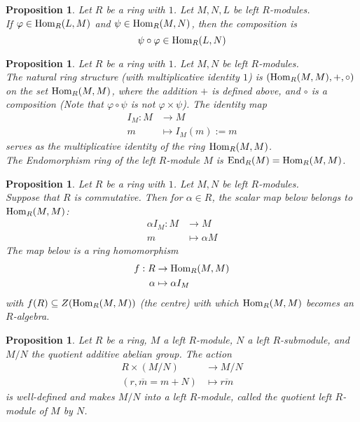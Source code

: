 \documentclass[a4paper,8pt]{article}
\newcommand{\hlt}[1]{\textit{{\color{blue}#1}}}
\newcommand{\homs}[1]{\textnormal{Hom}#1}
\theoremstyle{theorem}
\newtheorem{proposition}[theorem]{Proposition}
\begin{document}
\begin{proposition}
Let $R$ be a ring with $1$. Let $M, N, L$ be left $R$-modules.\\
If $\varphi \in \homs_R(L,M)$ and $\psi \in \homs_R(M,N)$, then the composition is
\begin{equation}
\psi \circ \varphi \in \homs_R(L,N) \nonumber
\end{equation}
\end{proposition}

\begin{proposition}
Let $R$ be a ring with $1$. Let $M, N$ be left $R$-modules.\\
The natural ring structure (with multiplicative identity $1$) is $(\homs_R(M,M), +, \circ)$ on the set $\homs_R(M,M)$, where the addition $+$ is defined above, and $\circ$ is a composition (Note that $\varphi \circ \psi$ is not $\varphi \times \psi$). The identity map
\begin{align}
I_M: M &\rightarrow M \nonumber \\
m &\mapsto I_M(m) := m \nonumber
\end{align}
serves as the multiplicative identity of the ring $\homs_R(M,M)$.\\
The \hlt{Endomorphism ring} of the left $R$-module $M$ is $\textnormal{End}_R(M) = \homs_R(M,M)$.
\end{proposition}

\begin{proposition}
Let $R$ be a ring with $1$. Let $M, N$ be left $R$-modules.\\
Suppose that $R$ is commutative. Then for $\alpha \in R$, the \hlt{scalar map} below belongs to $\homs_R(M,M)$:
\begin{align}
\alpha I_M: M &\rightarrow M \nonumber \\
m &\mapsto \alpha M \nonumber
\end{align}
The map below is a ring homomorphism
\begin{align}
f: R &\rightarrow \homs_R(M,M) \nonumber \\
\alpha &\mapsto \alpha I_M \nonumber
\end{align}
with $f(R) \subseteq Z(\homs_R(M,M))$ (the centre) with which $\homs_R(M,M)$ becomes an $R$-algebra.
\end{proposition}

\begin{proposition}
Let $R$ be a ring, $M$ a left $R$-module, $N$ a left $R$-submodule, and $M/N$ the quotient additive abelian group. The action
\begin{align}
R \times (M/N) &\rightarrow M/N \nonumber \\
(r, \overline{m} = m+N) &\mapsto \overline{rm} \nonumber
\end{align}
is well-defined and makes $M/N$ into a left $R$-module, called the \hlt{quotient left $R$-module} of $M$ by $N$.
\end{proposition}
\end{document}
